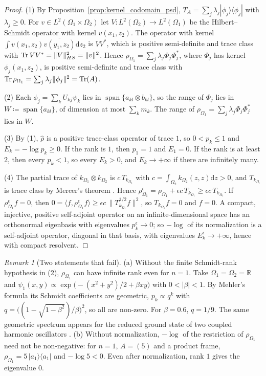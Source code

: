 \documentclass[11pt,a4paper,reqno]{amsart}
\theoremstyle{definition}
\theoremstyle{remark}
\newtheorem{remark}[theorem]{Remark}
\numberwithin{equation}{section}
\newcommand{\dif}{\mathrm{d}}
\begin{document}
\begin{proof}
(1) By Proposition~\ref{prop:kernel_codomain_psd}, $T_A = \sum_{j} \lambda_j |\phi_j\rangle\langle\phi_j|$ with $\lambda_j \ge 0$. For $v \in L^2(\Omega_1\times\Omega_2)$ let $V \colon L^2(\Omega_2) \to L^2(\Omega_1)$ be the Hilbert--Schmidt operator with kernel $v(x_1, z_2)$. The operator with kernel $\int v(x_1,z_2)\overline{v(y_1,z_2)}\dif z_2$ is $VV^*$, which is positive semi-definite and trace class with $\Tr VV^* = \|V\|_{HS}^2 = \|v\|^2$. Hence $\rho_{\Omega_1} = \sum_j \lambda_j \Phi_j\Phi_j^*$, where $\Phi_j$ has kernel $\phi_j(x_1,z_2)$, is positive semi-definite and trace class with $\Tr\rho_{\Omega_1} = \sum_j \lambda_j\|\phi_j\|^2 = \Tr(A)$.

(2) Each $\phi_j = \sum_k U_{kj}\psi_k$ lies in $\operatorname{span}\{a_{kl}\otimes b_{kl}\}$, so the range of $\Phi_j$ lies in $W \coloneqq \operatorname{span}\{a_{kl}\}$, of dimension at most $\sum_k m_k$. The range of $\rho_{\Omega_1} = \sum_j\lambda_j\Phi_j\Phi_j^*$ lies in $W$.

(3) By (1), $\hat\rho$ is a positive trace-class operator of trace $1$, so $0 < p_k \le 1$ and $E_k = -\log p_k \ge 0$. If the rank is $1$, then $p_1 = 1$ and $E_1 = 0$. If the rank is at least $2$, then every $p_k < 1$, so every $E_k > 0$, and $E_k \to +\infty$ if there are infinitely many.

(4) The partial trace of $k_{\Omega_1}\otimes k_{\Omega_2}$ is $c\,T_{k_{\Omega_1}}$ with $c = \int_{\Omega_2} k_{\Omega_2}(z,z)\dif z > 0$, and $T_{k_{\Omega_i}}$ is trace class by Mercer's theorem \cite{Mercer1909}. Hence $\rho^\epsilon_{\Omega_1} = \rho_{\Omega_1} + \epsilon c\,T_{k_{\Omega_1}} \ge \epsilon c\,T_{k_{\Omega_1}}$. If $\rho^\epsilon_{\Omega_1} f = 0$, then $0 = \langle f, \rho^\epsilon_{\Omega_1} f\rangle \ge \epsilon c\,\|T_{k_{\Omega_1}}^{1/2} f\|^2$, so $T_{k_{\Omega_1}} f = 0$ and $f = 0$. A compact, injective, positive self-adjoint operator on an infinite-dimensional space has an orthonormal eigenbasis with eigenvalues $p_k^\epsilon \to 0$; so $-\log$ of its normalization is a self-adjoint operator, diagonal in that basis, with eigenvalues $E_k^\epsilon \to +\infty$, hence with compact resolvent.
\end{proof}

\begin{remark}[Two statements that fail]
\label{rem:rank_counterexample}
(a) Without the finite Schmidt-rank hypothesis in (2), $\rho_{\Omega_1}$ can have infinite rank even for $n = 1$. Take $\Omega_1 = \Omega_2 = \mathbb{R}$ and $\psi_1(x, y) \propto \exp\big(-(x^2+y^2)/2 + \beta x y\big)$ with $0 < |\beta| < 1$. By Mehler's formula \cite[eq.~18.18.28]{DLMF} its Schmidt coefficients are geometric, $p_k \propto q^k$ with $q = \big((1 - \sqrt{1-\beta^2})/\beta\big)^2$, so all are non-zero. For $\beta = 0.6$, $q = 1/9$. The same geometric spectrum appears for the reduced ground state of two coupled harmonic oscillators \cite{Srednicki1993}.
(b) Without normalization, $-\log$ of the restriction of $\rho_{\Omega_1}$ need not be non-negative: for $n = 1$, $A = (5)$ and a product frame, $\rho_{\Omega_1} = 5\,|a_1\rangle\langle a_1|$ and $-\log 5 < 0$. Even after normalization, rank $1$ gives the eigenvalue $0$.
\end{remark}
\end{document}
